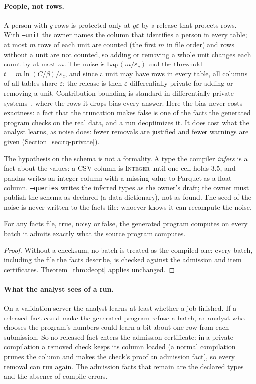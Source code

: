 \paragraph{People, not rows.} A person with $g$ rows is protected only at $g\varepsilon$ by a release that
protects rows. With \texttt{--unit} the owner names the column that identifies a person in every table;
at most $m$ rows of each unit are counted (the first $m$ in file order) and rows without a unit are not
counted, so adding or removing a whole unit changes each count by at most $m$. The noise is
$\mathrm{Lap}(m/\varepsilon_c)$ and the threshold $t = m\ln(C/\beta)/\varepsilon_c$, and since a unit may have
rows in every table, all columns of all tables share $\varepsilon$; the release is then
$\varepsilon$-differentially private for adding or removing a unit. Contribution bounding is standard
in differentially private systems~\cite{wilson2020}, where the rows it drops bias every answer. Here
the bias never costs exactness: a fact that the truncation makes false is one of the facts the generated
program checks on the real data, and a run deoptimizes it. It does cost what the analyst learns, as noise
does: fewer removals are justified and fewer warnings are given (Section~\ref{sec:rq-private}).

The hypothesis on the schema is not a formality. A type the compiler \emph{infers} is a fact about the
values: a CSV column is \textsc{Integer} until one cell holds 3.5, and pandas writes an integer column
with a missing value to Parquet as a float column. \texttt{--queries} writes the inferred types as the
owner's draft; the owner must publish the schema as declared (a data dictionary), not as found. The seed
of the noise is never written to the facts file: whoever knows it can recompute the noise.

\begin{theorem}\label{thm:anyfacts}
For any facts file, true, noisy or false, the generated program computes on every batch it admits
exactly what the source program computes.
\end{theorem}
\begin{proof}
Without a checksum, no batch is treated as the compiled one: every batch, including the file the
facts describe, is checked against the admission and item certificates. Theorem~\ref{thm:deopt}
applies unchanged.
\end{proof}

\paragraph{What the analyst sees of a run.} On a validation server the analyst learns at least
whether a job finished. If a released fact could make the generated program refuse a batch, an
analyst who chooses the program's numbers could learn a bit about one row from each submission. So
no released fact enters the admission certificate: in a private compilation a removed check keeps its
column loaded (a normal compilation prunes the column and makes the check's proof an admission fact),
so every removal can run again. The admission facts that remain are the declared types and the
absence of compile errors.

